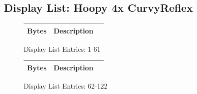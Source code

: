 \subsection*{Display List: Hoopy 4x CurvyReflex}
\vspace{-0.5cm}
\begin{minipage}[b]{0.31\linewidth}
  \begin{figure}[H]
    {
      \setlength{\tabcolsep}{3.0pt}
      \setlength\cmidrulewidth{\heavyrulewidth} %
      \begin{adjustbox}{height=8.5cm}

        \begin{tabular}{lll}
          \toprule
          Bytes       & Description                                                         \\
          \midrule
          
        \end{tabular}

      \end{adjustbox}

    }\caption*{Display List Entries: 1-61}
  \end{figure}
\end{minipage}
\hspace{0.1cm}
\begin{minipage}[b]{0.31\linewidth}
  \begin{figure}[H]
    {
      \setlength{\tabcolsep}{3.0pt}
      \setlength\cmidrulewidth{\heavyrulewidth} %
      \begin{adjustbox}{height=8.5cm}

        \begin{tabular}{lll}
          \toprule
          Bytes       & Description                                                         \\
          \midrule
        \end{tabular}

      \end{adjustbox}

    }\caption*{Display List Entries: 62-122}
  \end{figure}
\end{minipage}
\hspace{0.1cm}
